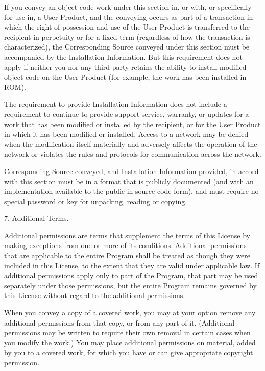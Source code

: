 \documentclass[a4paper,10pt,english]{sphinxmanual}
\begin{document}
\begin{sphinxVerbatim}[commandchars=\\\{\}]
  If you convey an object code work under this section in, or with, or
specifically for use in, a User Product, and the conveying occurs as
part of a transaction in which the right of possession and use of the
User Product is transferred to the recipient in perpetuity or for a
fixed term (regardless of how the transaction is characterized), the
Corresponding Source conveyed under this section must be accompanied
by the Installation Information.  But this requirement does not apply
if neither you nor any third party retains the ability to install
modified object code on the User Product (for example, the work has
been installed in ROM).

  The requirement to provide Installation Information does not include a
requirement to continue to provide support service, warranty, or updates
for a work that has been modified or installed by the recipient, or for
the User Product in which it has been modified or installed.  Access to a
network may be denied when the modification itself materially and
adversely affects the operation of the network or violates the rules and
protocols for communication across the network.

  Corresponding Source conveyed, and Installation Information provided,
in accord with this section must be in a format that is publicly
documented (and with an implementation available to the public in
source code form), and must require no special password or key for
unpacking, reading or copying.

  7. Additional Terms.

  \PYGZdq{}Additional permissions\PYGZdq{} are terms that supplement the terms of this
License by making exceptions from one or more of its conditions.
Additional permissions that are applicable to the entire Program shall
be treated as though they were included in this License, to the extent
that they are valid under applicable law.  If additional permissions
apply only to part of the Program, that part may be used separately
under those permissions, but the entire Program remains governed by
this License without regard to the additional permissions.

  When you convey a copy of a covered work, you may at your option
remove any additional permissions from that copy, or from any part of
it.  (Additional permissions may be written to require their own
removal in certain cases when you modify the work.)  You may place
additional permissions on material, added by you to a covered work,
for which you have or can give appropriate copyright permission.


\end{sphinxVerbatim}
\end{document}
